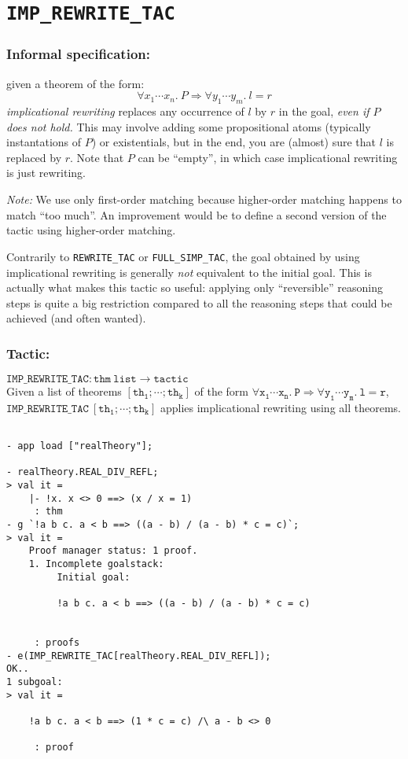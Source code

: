 \documentclass{llncs}
\newcommand*\IMPREWRITETAC{\texttt{IMP\_REWRITE\_TAC}\xspace}
\newcommand*\REWRITETAC{\texttt{REWRITE\_TAC}\xspace}
\newcommand*\SIMPTAC{\texttt{FULL\_SIMP\_TAC}\xspace}
\begin{document}
	\section{\IMPREWRITETAC}
		\subsubsection{Informal specification:}
		given a theorem of the form:
    \[\forall x_1\cdots x_n.\ P \Rightarrow \forall y_1\cdots y_m.\ l = r\]
    \emph{implicational rewriting} replaces any occurrence of $l$ by $r$
    in the goal, \emph{even if $P$ does not hold.}
		This may involve adding some propositional atoms (typically instantations of $P$) or existentials,
    but in the end, you are (almost) sure that $l$ is replaced by $r$.
    Note that $P$ can be ``empty'', in which case implicational rewriting is just rewriting.

    \emph{Note:} We use only first-order matching because higher-order matching happens to match ``too much''.
    An improvement would be to define a second version of the tactic using higher-order matching.

    \begin{remark}
      Contrarily to \REWRITETAC or \SIMPTAC, the goal obtained by using implicational rewriting is generally 
      \emph{not} equivalent to the initial goal. This is actually what makes this tactic so useful:
      applying only ``reversible'' reasoning steps is quite a big restriction compared to all the
      reasoning steps that could be achieved (and often wanted).
    \end{remark}

		\subsubsection{Tactic:}
		$\mathtt{\IMPREWRITETAC: thm\ list \to tactic}$\\
    Given a list of theorems $\mathtt{[th_1;\cdots;th_k]}$
    of the form $\mathtt{\forall x_1\cdots x_n.\ P \Rightarrow \forall y_1\cdots y_m.\ l = r}$,
		$\mathtt{\IMPREWRITETAC\ [th_1;\cdots;th_k]}$ applies implicational rewriting using all theorems.

    \begin{example}
      \label{ex:imp_rewrite_tac}
    \begin{verbatim}

- app load ["realTheory"];

- realTheory.REAL_DIV_REFL;
> val it =
    |- !x. x <> 0 ==> (x / x = 1)
     : thm
- g `!a b c. a < b ==> ((a - b) / (a - b) * c = c)`;
> val it =
    Proof manager status: 1 proof.
    1. Incomplete goalstack:
         Initial goal:
    
         !a b c. a < b ==> ((a - b) / (a - b) * c = c)
    
    
     : proofs
- e(IMP_REWRITE_TAC[realTheory.REAL_DIV_REFL]);
OK..
1 subgoal:
> val it =
    
    !a b c. a < b ==> (1 * c = c) /\ a - b <> 0
    
     : proof \end{verbatim}
    \end{example}
    
\end{document}
